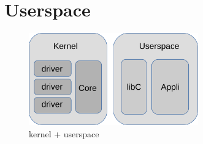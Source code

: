 \section{Userspace}
	\begin{frame}
		\begin{figure}
		\includegraphics[height=4cm]{img/arch_linux_full.png}
		\caption{kernel + userspace}
		\end{figure}
	\end{frame}

